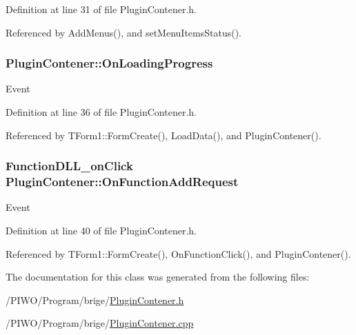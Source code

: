 Definition at line 31 of file PluginContener.h.

Referenced by AddMenus(), and setMenuItemsStatus().\hypertarget{classPluginContener_b43b8d2068dc7e853cd25fac856496d0}{
\subsubsection[OnLoadingProgress]{ {\bf PluginContener::OnLoadingProgress}}}
\label{classPluginContener_b43b8d2068dc7e853cd25fac856496d0}


Event 

Definition at line 36 of file PluginContener.h.

Referenced by TForm1::FormCreate(), LoadData(), and PluginContener().\hypertarget{classPluginContener_a02d916f81857542ff8c77aa0c8b4dd6}{
\subsubsection[OnFunctionAddRequest]{\setlength{\rightskip}{0pt plus 5cm}FunctionDLL\_\-onClick {\bf PluginContener::OnFunctionAddRequest}}}
\label{classPluginContener_a02d916f81857542ff8c77aa0c8b4dd6}


Event 

Definition at line 40 of file PluginContener.h.

Referenced by TForm1::FormCreate(), OnFunctionClick(), and PluginContener().

The documentation for this class was generated from the following files:\begin{CompactItemize}
\item 
/PIWO/Program/brige/\hyperlink{PluginContener_8h}{PluginContener.h}\item 
/PIWO/Program/brige/\hyperlink{PluginContener_8cpp}{PluginContener.cpp}\end{CompactItemize}
